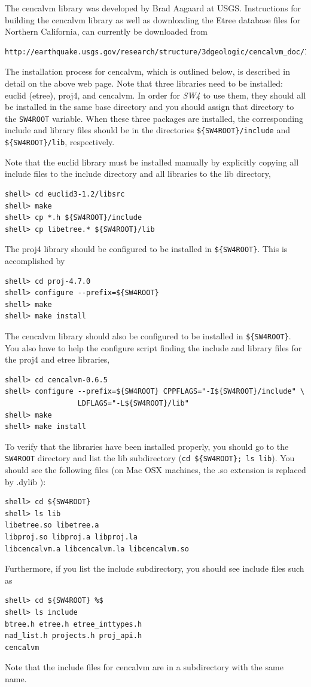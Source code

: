 \documentclass[11pt]{report}
\begin{document}
The cencalvm library was developed by Brad Aagaard at USGS. Instructions for building the cencalvm
library as well as downloading the Etree database files for Northern California, can
currently be downloaded from
\begin{verbatim}
http://earthquake.usgs.gov/research/structure/3dgeologic/cencalvm_doc/INSTALL.html
\end{verbatim}
The installation process for cencalvm, which is outlined below, is described in detail on the above
web page.  Note that three libraries need to be installed: euclid (etree), proj4, and cencalvm.  In
order for \emph{SW4} to use them, they should all be installed in the same base directory and you
should assign that directory to the \verb+SW4ROOT+ variable. When these three packages are installed, the
corresponding include and library files should be in the directories \verb+${SW4ROOT}/include+ and
\verb+${SW4ROOT}/lib+, respectively.

Note that the euclid library must be installed manually by explicitly copying all include files to
the include directory and all libraries to the lib directory,
\begin{verbatim}
shell> cd euclid3-1.2/libsrc
shell> make
shell> cp *.h ${SW4ROOT}/include
shell> cp libetree.* ${SW4ROOT}/lib
\end{verbatim}
The proj4 library should be configured to be installed in \verb+${SW4ROOT}+. This is accomplished by
\begin{verbatim}
shell> cd proj-4.7.0
shell> configure --prefix=${SW4ROOT}
shell> make
shell> make install
\end{verbatim}
The cencalvm library should also be configured to be installed in \verb+${SW4ROOT}+. You also have to help
the configure script finding the include and library files for the proj4 and etree libraries,
\begin{verbatim}
shell> cd cencalvm-0.6.5
shell> configure --prefix=${SW4ROOT} CPPFLAGS="-I${SW4ROOT}/include" \
                 LDFLAGS="-L${SW4ROOT}/lib"
shell> make
shell> make install
\end{verbatim}

To verify that the libraries have been installed properly, you should go to the \verb+SW4ROOT+ directory
and list the lib subdirectory (\verb+cd ${SW4ROOT}; ls lib+). You should see the following files (on
Mac OSX machines, the .so extension is replaced by .dylib ):
\begin{verbatim}
shell> cd ${SW4ROOT}
shell> ls lib
libetree.so libetree.a 
libproj.so libproj.a libproj.la 
libcencalvm.a libcencalvm.la libcencalvm.so 
\end{verbatim}
Furthermore, if you list the include subdirectory, you should see include files such as 
\begin{verbatim}
shell> cd ${SW4ROOT} %$
shell> ls include
btree.h etree.h etree_inttypes.h
nad_list.h projects.h proj_api.h
cencalvm
\end{verbatim}
Note that the include files for cencalvm are in a subdirectory with the same name.
\end{document}
